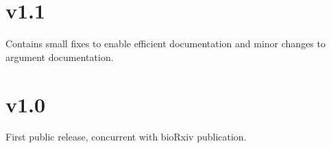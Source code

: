 \documentclass[letterpaper,12pt,english]{sphinxmanual}
\begin{document}
\section{v1.1}
\label{\detokenize{releases:v1-1}}
Contains small fixes to enable efficient documentation and minor changes to argument documentation.


\section{v1.0}
\label{\detokenize{releases:v1-0}}
First public release, concurrent with bioRxiv publication.



\renewcommand{\indexname}{Index}
\printindex
\end{document}
